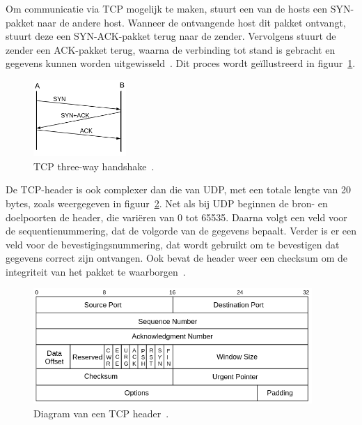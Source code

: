 Om communicatie via TCP mogelijk te maken, stuurt een van de hosts een SYN-pakket naar de andere host.
Wanneer de ontvangende host dit pakket ontvangt, stuurt deze een SYN-ACK-pakket terug naar de zender.
Vervolgens stuurt de zender een ACK-pakket terug, waarna de verbinding tot stand is gebracht en gegevens kunnen worden uitgewisseld~\autocite{hypponen2021securing}.
Dit proces wordt geïllustreerd in figuur~\ref{fig:netwerk-tcp-handshake}.

\begin{figure}[h!]
    \begin{center}
        \includegraphics[width=100pt]
        {./graphics/network/tcp-handshake.png}
        \caption[TCP three-way handshake diagram.]{\label{fig:netwerk-tcp-handshake}TCP three-way handshake~\autocite{dordal2020}.}
    \end{center}
\end{figure}

De TCP-header is ook complexer dan die van UDP, met een totale lengte van 20 bytes, zoals weergegeven in figuur~\ref{fig:netwerk-tcp-header}.
Net als bij UDP beginnen de bron- en doelpoorten de header, die vari\"eren van 0 tot 65535.
Daarna volgt een veld voor de sequentienummering, dat de volgorde van de gegevens bepaalt.
Verder is er een veld voor de bevestigingsnummering, dat wordt gebruikt om te bevestigen dat gegevens correct zijn ontvangen.
Ook bevat de header weer een checksum om de integriteit van het pakket te waarborgen~\autocite{dordal2020}.

\begin{figure}[h!]
    \begin{center}
        \includegraphics[width=300pt]
        {./graphics/network/tcp-header.png}
        \caption[TCP header diagram.]{\label{fig:netwerk-tcp-header}Diagram van een TCP header~\autocite{dordal2020}.}
    \end{center}
\end{figure}

